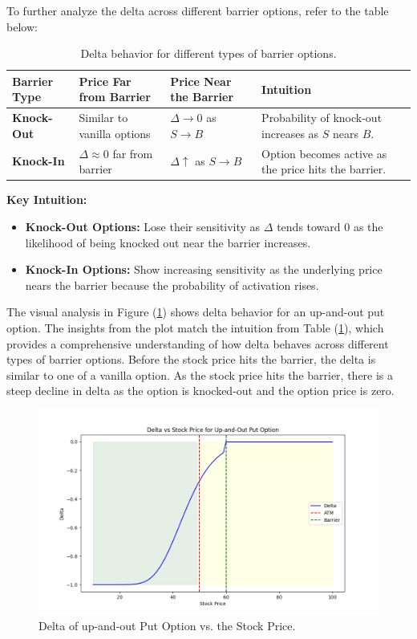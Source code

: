 To further analyze the delta across different barrier options, refer to the table below:
\begin{center}
	\begin{table}[H]
		\begin{tabular}{ | m{3cm} | m{5cm}| m{4cm} | m{4cm}|} 
			\hline
			\textbf{Barrier Type} & \textbf{Price Far from Barrier} & \textbf{Price Near the Barrier} & \textbf{Intuition}  \\
			\hline
			\textbf{Knock-Out} & Similar to vanilla options     & $\Delta \to 0$ as $S \to B$  & Probability of knock-out increases as $S$ nears $B$. \\ 
			\hline
			\textbf{Knock-In}  & $\Delta \approx 0$ far from barrier   & $\Delta \uparrow$ as $S \to B$  & Option becomes active as the price hits the barrier. \\ 
			\hline
		\end{tabular}
		\caption{Delta behavior for different types of barrier options.}
		\label{tab:delta_barrier_options}
	\end{table}
\end{center}
\textbf{Key Intuition:}
\begin{itemize}
	\item \textbf{Knock-Out Options:} Lose their sensitivity as $\Delta$ tends toward $0$ as the likelihood of being knocked out near the barrier increases.
	\item \textbf{Knock-In Options:} Show increasing sensitivity as the underlying price nears the barrier because the probability of activation rises.
\end{itemize}

The visual analysis in Figure (\ref{fig:delta_upout}) shows delta behavior for an up-and-out put option. The insights from the plot match the intuition from Table (\ref{tab:delta_barrier_options}), which provides a comprehensive understanding of how delta behaves across different types of barrier options. Before the stock price hits the barrier, the delta is similar to one of a vanilla option. As the stock price hits the barrier, there is a steep decline in delta as the option is knocked-out and the option price is zero.
\begin{figure}[H]
    \centering
    \includegraphics[width=.65\linewidth]{content/images/delta.png}
    \caption{Delta of up-and-out Put Option vs. the Stock Price.}
    \label{fig:delta_upout}
\end{figure}

